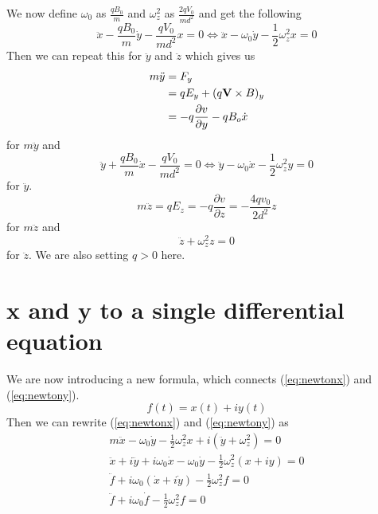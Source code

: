 \documentclass[english,notitlepage,reprint,nofootinbib]{revtex4-1}  %
\begin{document}
	We now define $\omega_0$ as $\frac{q B_0}{m}$ and $\omega_z^2$ as $\frac{2 q V_0}{md^2}$ and get the following
	\begin{equation} \label{eq:newton_x}
		\ddot{x} - \frac{q B_0}{m} \dot{y} - \frac{q V_0}{m d^2} x = 0 \Leftrightarrow \ddot{x} - \omega_0 \dot{y} - \frac{1}{2} \omega^2_z x = 0
	\end{equation}
	Then we can repeat this for $\ddot{y}$ and $\ddot{z}$ which gives us
	\begin{align*}
		m \ddot{y} &= F_y \\
		&= q E_y + (q \vectorbold{V} \times B)_y \\
		&= - q \frac{\partial v}{\partial y} - q B_o \dot{x}
	\end{align*}
	for $m \ddot{y}$ and 
	\begin{equation} 
		\ddot{y} + \frac{q B_0}{m} \dot{x} - \frac{q V_0}{m d^2} = 0 \Leftrightarrow \ddot{y} - \omega_0 \dot{x} - \frac{1}{2} \omega^2_z y = 0
	\end{equation}
	for $\ddot{y}$.
	\begin{equation*}
		m \ddot{z} = q E_z = -q \frac{\partial v}{\partial z} = - \frac{4 q v_0}{2 d^2} z
	\end{equation*}
	for $m \ddot{z}$ and
	\begin{equation} 
		\ddot{z} + \omega^2_z z = 0
	\end{equation}
	for $\ddot{z}$. We are also setting $q > 0$ here.
	
	\section{x and y to a single differential equation} \label{eq_motion2}
	We are now introducing a new formula, which connects (\ref{eq:newtonx}) and (\ref{eq:newtony}).
	\begin{equation*}
		f(t) = x(t) + iy(t)
	\end{equation*}
	Then we can rewrite (\ref{eq:newtonx}) and (\ref{eq:newtony}) as
	\begin{align*} 
		m \ddot{x} - \omega_0 \dot{y} - \frac{1}{2} \omega_z^2 x + i(\ddot{y} + \omega_z^2) = 0 \\
		\ddot{x} + i \ddot{y} + i \omega_0 \dot{x} - \omega_0 \dot{y} - \frac{1}{2} \omega_z^2 (x + iy) = 0 \\
		\ddot{f} + i \omega_0 (\dot{x} + i \dot{y}) - \frac{1}{2} \omega_z^2 f = 0 \\
		\ddot{f} + i \omega_0 \dot{f} - \frac{1}{2} \omega_z^2 f = 0
	\end{align*}
	
\end{document}
